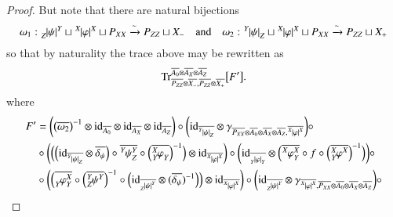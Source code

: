 \documentclass{amsart}
\def\tn{\textnormal}
\def\Trace{\tn{Tr}}
\def\ol{\overline}
\newcommand{\To}[1]{\xrightarrow{#1}}
\def\id{\tn{id}}
\newcommand{\inp}[1]{{#1_-}}
\newcommand{\outp}[1]{{#1_+}}
\newcommand{\feeddd}[3]{{\tensor*[^{#2}_{\color{white}{!}}]{{|#1|}}{^{#3}}}}%
\newcommand{\feeddc}[3]{{\tensor*[^{#2}]{{|#1|}}{_{#3}}}}
\newcommand{\feedcd}[3]{{\tensor*[_{#2}]{{|#1|}}{^{#3}}}}
\newcommand{\feedcc}[3]{{\tensor*[^{\color{white}{!}}_{#2}]{{|#1|}}{_{#3}}}}
\newcommand{\feedda}[3]{{\tensor*[^{#2}_{\color{white}{!}}]{{#1}}{^{#2}_{#3}}}}
\newcommand{\feedca}[3]{{\tensor*[_{#2}]{{#1}}{_{#2}^{#3}}}}
\newcommand{\feedad}[3]{{\tensor*[^{#2}_{#3}]{{#1}}{^{#2}}}}
\newcommand{\feedac}[3]{{\tensor*[_{#2}^{#3}]{{#1}}{_{#2}}}}
\theoremstyle{remark}
\theoremstyle{definition}
\begin{document}
\begin{proof}
But note that there are natural bijections 
\[\omega_1:\feedcd{\psi}{Z}{Y}\sqcup\feeddd{\varphi}{X}{X}\sqcup P_{XX}\To{\sim}P_{ZZ}\sqcup\inp{X}\quad\text{and}\quad \omega_2:\feeddc{\psi}{Y}{Z}\sqcup\feeddd{\varphi}{X}{X}\sqcup P_{XX}\To{\sim}P_{ZZ}\sqcup\outp{X}\]
so that by naturality the trace above may be rewritten as
\begin{equation}\label{eq:internal trace}
\Trace^{\ol{A_0}\otimes\ol{A_X}\otimes\ol{A_Z}}_{\ol{P_{ZZ}}\otimes\ol{\inp{X}},\ol{P_{ZZ}}\otimes\ol{\outp{X}}}
\big[F'\big].
\end{equation}
where
\begin{align*}
F'
&=\bigg(\big(\ol{\omega_2}\big)^{-1}\otimes\id_{\ol{A_0}}\otimes\id_{\ol{A_X}}\otimes\id_{\ol{A_Z}}\bigg)\circ\bigg(\id_{\ol{\feeddc{\psi}{Y}{Z}}}\otimes\gamma_{\ol{P_{XX}}\otimes\ol{A_0}\otimes\ol{A_X}\otimes\ol{A_Z},\ol{\feeddd{\varphi}{X}{X}}}\bigg)\circ\\
&\circ\bigg(\Big(\Big(\id_{\ol{\feeddc{\psi}{Y}{Z}}}\otimes\ol{\delta_\psi}\Big)\circ\ol{\feedda{\psi}{Y}{Z}}\circ\Big(\ol{\feedac{\varphi}{Y}{X}}\Big)^{-1}\Big)\otimes\id_{\ol{\feeddd{\varphi}{X}{X}}}\bigg)\circ\bigg(\id_{\ol{\feedcc{\varphi}{Y}{Y}}}\otimes\Big(\ol{\feedda{\varphi}{X}{Y}}\circ f\circ\Big(\ol{\feedad{\varphi}{X}{Y}}\Big)^{-1}\Big)\bigg)\circ\\
&\circ\bigg(\Big(\ol{\feedca{\varphi}{Y}{X}}\circ\Big(\ol{\feedad{\psi}{Y}{Z}}\Big)^{-1}\circ\Big(\id_{\ol{\feedcd{\psi}{Z}{Y}}}\otimes(\ol{\delta_\psi})^{-1}\Big)\Big)\otimes\id_{\ol{\feeddd{\varphi}{X}{X}}}\bigg)\circ\bigg(\id_{\ol{\feedcd{\psi}{Z}{Y}}}\otimes\gamma_{\ol{\feeddd{\varphi}{X}{X}},\ol{P_{XX}}\otimes\ol{A_0}\otimes\ol{A_X}\otimes\ol{A_Z}}\bigg)\circ\\

\end{align*}
\end{proof}
\end{document}
